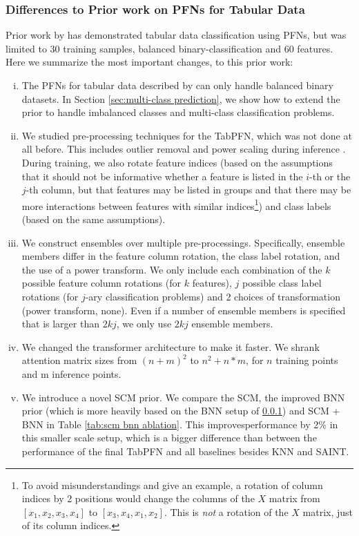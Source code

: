 \documentclass{article}
\begin{document}
\subsubsection{Differences to Prior work on PFNs for Tabular Data}
\label{app:comparison_muller}
Prior work by \cite{muller-iclr22a} has demonstrated tabular data classification using PFNs, but was limited to 30 training samples, balanced binary-classification and 60 features. Here we summarize the most important changes, to this prior work:
\begin{enumerate}[i), itemsep=-0.1em]
    \item The PFNs for tabular data described by \cite{muller-iclr22a} can only handle balanced binary datasets. In Section \ref{sec:multi-class prediction}, we show how to extend the prior to handle imbalanced classes and multi-class classification problems.
    \item  We studied pre-processing techniques for the TabPFN, which was not done at all before. This includes outlier removal and power scaling during inference \citep{yeo2000new}. 
    During training, we also rotate feature indices (based on the assumptions that it should not be informative whether a feature is listed in the $i$-th or the $j$-th column, but that features may be listed in groups and that there may be more interactions between features with similar indices\footnote{To avoid misunderstandings and give an example, a rotation of column indices by 2 positions would change the columns of the $X$ matrix from $[x_1, x_2, x_3, x_4]$ to $[x_3, x_4, x_1, x_2]$. This is \emph{not} a rotation of the $X$ matrix, just of its column indices.}) and class labels (based on the same assumptions).
    \item We construct ensembles over multiple pre-processings. Specifically, ensemble members differ in the feature column rotation, the class label rotation, and the use of a power transform. We only include each combination of the $k$ possible feature column rotations (for $k$ features), $j$ possible class label rotations (for $j$-ary classification problems) and 2 choices of transformation (power transform, none). Even if a number of ensemble members is specified that is larger than $2kj$, we only use $2kj$ ensemble members.
    \item We changed the transformer architecture to make it faster. We shrank attention matrix sizes from $(n+m)^2$ to $n^2 + n*m$, for $n$ training points and m inference points.
    \item We introduce a novel SCM prior. We compare the SCM, the improved BNN prior (which is more heavily based on the BNN setup of \ref{app:comparison_muller}) and SCM + BNN in Table \ref{tab:scm bnn ablation}. This improvesperformance by 2\% in this smaller scale setup, which is a bigger difference than between the performance of the final TabPFN and all baselines besides KNN and SAINT.
\end{enumerate}
\end{document}
